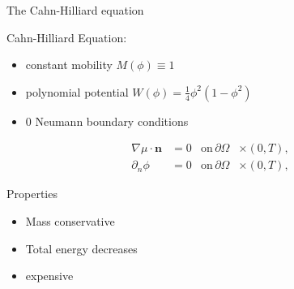\documentclass[presentation]{beamer}
\begin{document}
\begin{frame}[label={sec:orga77819f}]{The Cahn-Hilliard equation}
\begin{block}{Cahn-Hilliard Equation:}
\begin{itemize}
\item constant mobility \(M(\phi) \equiv 1\)
\item polynomial potential \(W(\phi) = \frac{1}{4} \phi^2(1-\phi^2)\)
\item 0 Neumann boundary conditions
\end{itemize}
\begin{equation}
\label{eq:boundary-conditions}
\begin{aligned}
\nabla\mu \cdot \mathbf{n} &= 0 & \text{on} \, \partial\Omega &\times (0,T),\\
\partial_n\phi &= 0 & \text{on} \, \partial\Omega &\times (0,T),
\end{aligned}
\end{equation}
\end{block}
\begin{block}{Properties}
\begin{itemize}
\item Mass conservative
\item Total energy decreases
\item expensive
\end{itemize}
\end{block}
\end{frame}
\end{document}
